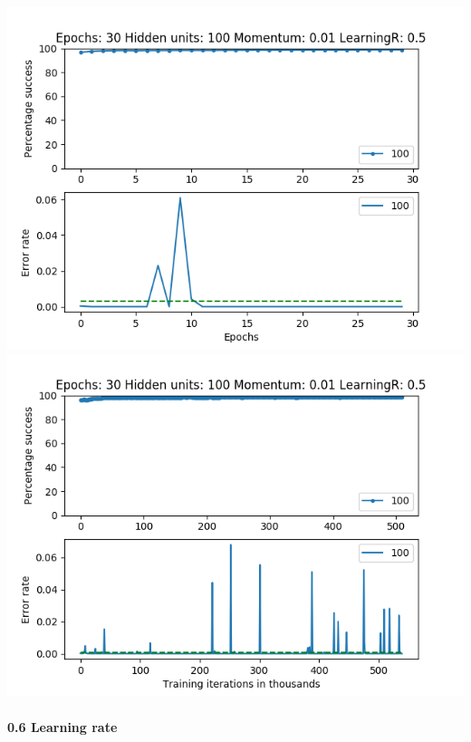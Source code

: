 \documentclass[11pt]{article}
\makeatletter
\def\maxwidth{\ifdim\Gin@nat@width>\linewidth\linewidth
    \else\Gin@nat@width\fi}
\let\Oldincludegraphics\includegraphics
\renewcommand{\includegraphics}[1]{\Oldincludegraphics[width=.8\maxwidth]{#1}}
\makeatother
\begin{document}
\includegraphics{Experiment1/E1_NN_Epoch_Momentum_0.01_30Epochs_100_LR_0.5_Hiddenunits.png}
\includegraphics{Experiment1/E1_NN_Training_Momentum_0.01_30Epochs_100_LR_0.5_Hiddenunits.png}

\hypertarget{learning-rate-5}{%
\paragraph{0.6 Learning rate}\label{learning-rate-5}}
\end{document}
